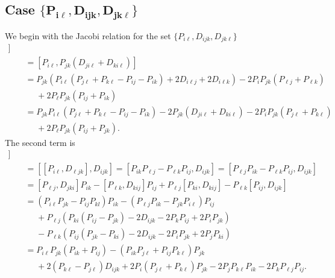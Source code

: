 \documentclass[pdftex]{sigma}
\numberwithin{equation}{section}
\begin{document}
\subsection[Case \{ P\_il, D\_ ijk, D\_ jkl\}]{Case $\boldsymbol{\{ P_{i \ell}, D_{ ijk}, D_{ jk\ell}\} }$}
We begin with the Jacobi relation for the set $\{ P_{i \ell}, D_{ ijk}, D_{ jk\ell}\}$
\begin{gather}
 [ P_{i \ell}, [ D_{ ijk}, D_{jkl}]]  \nonumber\\
 \qquad=  [P_{i\ell}, P_{jk}(D_{ji\ell} +D_{ki\ell}) ] \nonumber\\
 \qquad=  P_{jk}  ( P_{i\ell}( P_{j \ell}+ P_{k \ell} -P_{ij} -P_{ik}) +2D_{i \ell j} +2D_{ i\ell k}  )
   - 2P_i P_{jk}(P_{\ell j}+P_{\ell k}) \nonumber \\
   \phantom{\qquad  =}{}+ 2P_{\ell}P_{jk}(P_{ij} +P_{ik})\nonumber \\
\qquad=  P_{jk} P_{i\ell}(P_{j \ell}+P_{k\ell}-P_{ij} -P_{ik} )
  -2P_{jk}(D_{j i \ell} + D_{k i \ell})- 2 P_iP_{jk}  (P_{j \ell} +P_{k \ell} ) \nonumber \\
 \phantom{\qquad  =}{} +2P_{\ell}P_{jk}  (P_{ij} +P_{jk} ).\label{Acom}
 \end{gather}
The second term is
\begin{gather}
   [ D_{ ijk}, [D_{jk\ell}, P_{i \ell}]]\nonumber\\
   \qquad=  [[  P_{i\ell},D_{\ell jk}], D_{ijk}]  = [P_{ik} P_{\ell j} -P_{\ell k} P_{ij}, D_{ijk}]
   =  [ P_{\ell j}P_{ik} -P_{\ell k} P_{ij}, D_{ijk}]\nonumber\\
   \qquad=  [ P_{\ell j}, D_{jki}]P_{ik} - [P_{\ell k}, D_{kij}]P_{ij} + P_{\ell j} [P_{ki}, D_{kij} ]-P_{\ell k}[P_{ij}, D_{ijk}]\nonumber \\
 \qquad  =  (P_{i \ell}P_{jk}-P_{ij}P_{kl})P_{ik} - (P_{\ell j} P_{ik}- P_{jk}P_{i \ell}) P_{ij} \nonumber \\
   \phantom{\qquad  =}{} + P_{\ell j} ( P_{ki}( P_{ij}-P_{jk}) - 2D_{ijk} -2P_k P_{ij}+2P_iP_{jk} )\nonumber \\
      \phantom{\qquad  =}{}  - P_{\ell k} ( P_{ij}( P_{jk}-P_{ki}) - 2D_{ijk} -2P_i P_{jk}+2P_jP_{ki} )\nonumber \\
 \qquad =  P_{i \ell}P_{jk}(P_{ik}+P_{ij}) - (P_{ik} P_{j\ell}+P_{ij}P_{k \ell}) P_{jk} \nonumber\\
     \phantom{\qquad  =}{}   +2(P_{k \ell}-P_{j \ell})D_{ijk}+ 2P_i(P_{j\ell}+P_{k\ell}) P_{jk} - 2P_{j}P_{k\ell}P_{ik}-2P_k P_{\ell j} P_{ij}.\label{Bcom}
   \end{gather}
\end{document}
